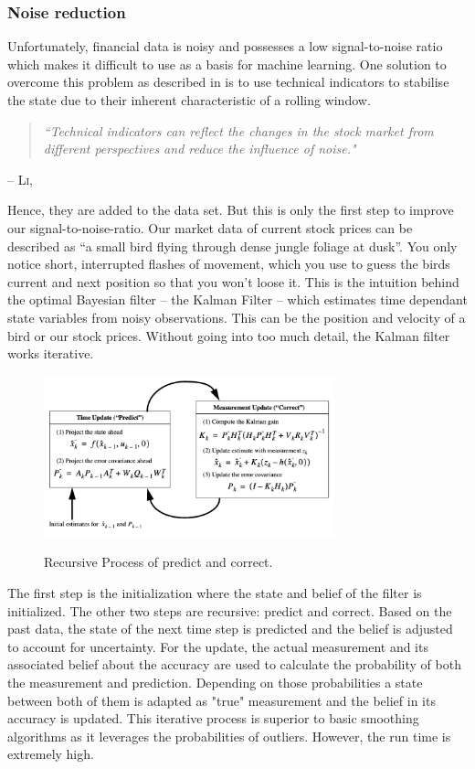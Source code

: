 \documentclass[12pt]{article}
\newcommand{\chapquote}[3]{\begin{quotation} \textit{#1} \end{quotation} \begin{flushright} -- #2, \textit{#3}\end{flushright} }
\begin{document}
\subsubsection{Noise reduction} %
Unfortunately, financial data is noisy and possesses a low signal-to-noise ratio  which makes it difficult to use as a basis for machine learning. \cite{Prado2018, Hull2021} One solution to overcome this problem as described in \cite{Li2022}  is to use technical indicators to stabilise the state due to their inherent characteristic of a rolling window. 
\chapquote{``Technical indicators can reflect the changes in the stock market \newline from different perspectives and reduce the influence of noise."}{\textsc{Li}}{\cite[p. 1]{Li2022}}
Hence, they are added to the data set. But this is only the first step to improve our signal-to-noise-ratio. Our market data of current stock prices can be described as \enquote{a small bird flying through dense jungle foliage at dusk}\cite[p. 497]{Russell2021}. You only notice short, interrupted flashes of movement, which you use to guess the birds current and next position so that you won't loose it. This is the intuition behind the optimal Bayesian filter -- the Kalman Filter -- which estimates time dependant state variables from noisy observations. This can be the position and velocity of a bird or our stock prices. Without going into too much detail, the Kalman filter works iterative. 

\begin{figure}[h]
\centering
\includegraphics[width=0.75\textwidth]{figs/KalmanProcess.png}   \\
\caption{ Recursive Process of predict and correct. \cite[p. 6]{Welch1994}}
\label{fig:finalnw}
\end{figure}
The first step is the initialization where the state and belief of the filter is initialized.
The other two steps are recursive: predict and correct.
Based on the past data, the state of the next time step is predicted and the belief is adjusted to account for uncertainty.
For the update, the actual measurement and its associated belief about the accuracy are used to calculate the probability of both the measurement and prediction. Depending on those probabilities a state between both of them is adapted as "true" measurement and the belief in its accuracy is updated. This iterative process is superior to basic smoothing algorithms as it leverages the probabilities of outliers. However, the run time is extremely high. \cite{Welch1994, Russell2021, Labbe2020}
  
\end{document}
